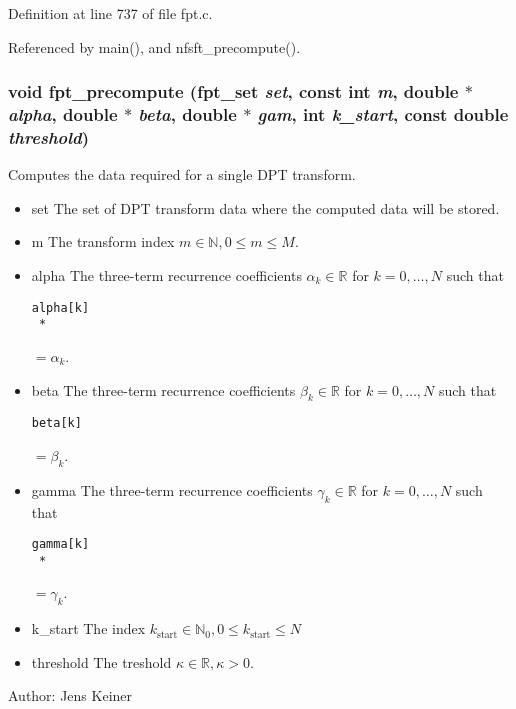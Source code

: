 Definition at line 737 of file fpt.c.

Referenced by main(), and nfsft\_\-precompute().\hypertarget{group__fpt_gd3c3b30fda57364c92958cc7390b6378}{
\subsubsection{\setlength{\rightskip}{0pt plus 5cm}void fpt\_\-precompute ({\bf fpt\_\-set} {\em set}, const int {\em m}, double $\ast$ {\em alpha}, double $\ast$ {\em beta}, double $\ast$ {\em gam}, int {\em k\_\-start}, const double {\em threshold})}}
\label{group__fpt_gd3c3b30fda57364c92958cc7390b6378}


Computes the data required for a single DPT transform. 

\begin{itemize}
\item set The set of DPT transform data where the computed data will be stored. \item m The transform index $m \in \mathbb{N}, 0 \le m \le M$. \item alpha The three-term recurrence coefficients $\alpha_k \in \mathbb{R}$ for $k=0,\ldots,N$ such that 

\footnotesize\begin{verbatim}alpha[k]
 *      \end{verbatim}
\normalsize
 $=\alpha_k$. \item beta The three-term recurrence coefficients $\beta_k \in \mathbb{R}$ for $k=0,\ldots,N$ such that 

\footnotesize\begin{verbatim}beta[k] \end{verbatim}
\normalsize
 $=\beta_k$. \item gamma The three-term recurrence coefficients $\gamma_k \in \mathbb{R}$ for $k=0,\ldots,N$ such that 

\footnotesize\begin{verbatim}gamma[k]
 *            \end{verbatim}
\normalsize
 $=\gamma_k$. \item k\_\-start The index $k_{\text{start}} \in \mathbb{N}_0, 0 \le k_{\text{start}} \le N$ \item threshold The treshold $\kappa \in \mathbb{R}, \kappa > 0$.\end{itemize}
\begin{Desc}
\item[Author:]Jens Keiner \end{Desc}


